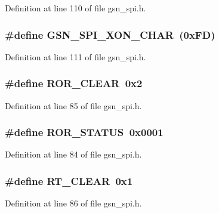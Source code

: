 Definition at line 110 of file gsn\_\-spi.h.

\hypertarget{a00587_a528c822cb1ddcd15b249cb9e6aaa4816}{
\subsubsection[{GSN\_\-SPI\_\-XON\_\-CHAR}]{\setlength{\rightskip}{0pt plus 5cm}\#define GSN\_\-SPI\_\-XON\_\-CHAR~(0xFD)}}
\label{a00587_a528c822cb1ddcd15b249cb9e6aaa4816}


Definition at line 111 of file gsn\_\-spi.h.

\hypertarget{a00587_a24c449323e2955bc782cdf3b34de1e33}{
\subsubsection[{ROR\_\-CLEAR}]{\setlength{\rightskip}{0pt plus 5cm}\#define ROR\_\-CLEAR~0x2}}
\label{a00587_a24c449323e2955bc782cdf3b34de1e33}


Definition at line 85 of file gsn\_\-spi.h.

\hypertarget{a00587_a2b4dc619ceaead61fe74bbcf490dc15b}{
\subsubsection[{ROR\_\-STATUS}]{\setlength{\rightskip}{0pt plus 5cm}\#define ROR\_\-STATUS~0x0001}}
\label{a00587_a2b4dc619ceaead61fe74bbcf490dc15b}


Definition at line 84 of file gsn\_\-spi.h.

\hypertarget{a00587_aa4b1a0a251c6fac18230a25d8d89388c}{
\subsubsection[{RT\_\-CLEAR}]{\setlength{\rightskip}{0pt plus 5cm}\#define RT\_\-CLEAR~0x1}}
\label{a00587_aa4b1a0a251c6fac18230a25d8d89388c}


Definition at line 86 of file gsn\_\-spi.h.

